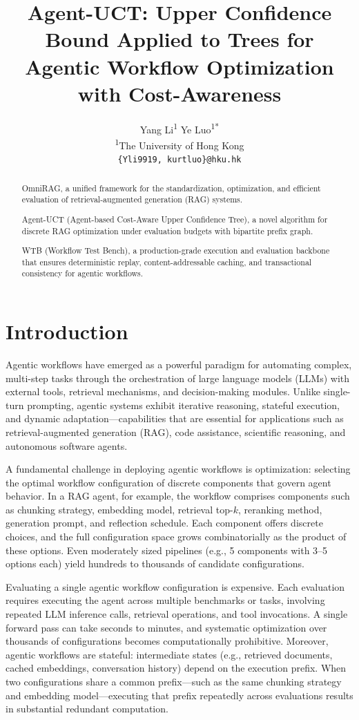 \documentclass{article}
\title{Agent-UCT: Upper Confidence Bound Applied to Trees for Agentic Workflow Optimization with Cost-Awareness}
\author{
    Yang Li\textsuperscript{1} \quad 
    Ye Luo\textsuperscript{1*}\footnotetext{*~Corresponding author and Supervisor.} 
    \\
    \vspace{0.2cm}
    \small \textsuperscript{1}The University of Hong Kong \\
    \small \texttt{\{Yli9919, kurtluo\}@hku.hk}
}
\date{}
\begin{document}
\maketitle

\begin{abstract}
    OmniRAG, a unified framework for the standardization, optimization, and efficient evaluation of retrieval-augmented generation (RAG) systems. 

Agent-UCT (Agent-based Cost-Aware Upper Confidence Tree), a novel algorithm for discrete RAG optimization under evaluation budgets with bipartite prefix graph.

WTB (Workflow Test Bench), a production-grade execution and evaluation backbone that ensures deterministic replay, content-addressable caching, and transactional consistency for agentic workflows.
\end{abstract}

\section{Introduction}

    Agentic workflows have emerged as a powerful paradigm for automating complex, multi-step tasks through the orchestration of large language models (LLMs) with external tools, retrieval mechanisms, and decision-making modules. Unlike single-turn prompting, agentic systems exhibit iterative reasoning, stateful execution, and dynamic adaptation—capabilities that are essential for applications such as retrieval-augmented generation (RAG), code assistance, scientific reasoning, and autonomous software agents.

    A fundamental challenge in deploying agentic workflows is optimization: selecting the optimal workflow configuration of discrete components that govern agent behavior. In a RAG agent, for example, the workflow comprises components such as chunking strategy, embedding model, retrieval top-$k$, reranking method, generation prompt, and reflection schedule. Each component offers discrete choices, and the full configuration space grows combinatorially as the product of these options. Even moderately sized pipelines (e.g., 5 components with 3–5 options each) yield hundreds to thousands of candidate configurations.

    Evaluating a single agentic workflow configuration is expensive. Each evaluation requires executing the agent across multiple benchmarks or tasks, involving repeated LLM inference calls, retrieval operations, and tool invocations. A single forward pass can take seconds to minutes, and systematic optimization over thousands of configurations becomes computationally prohibitive. Moreover, agentic workflows are stateful: intermediate states (e.g., retrieved documents, cached embeddings, conversation history) depend on the execution prefix. When two configurations share a common prefix—such as the same chunking strategy and embedding model—executing that prefix repeatedly across evaluations results in substantial redundant computation.
\end{document}
